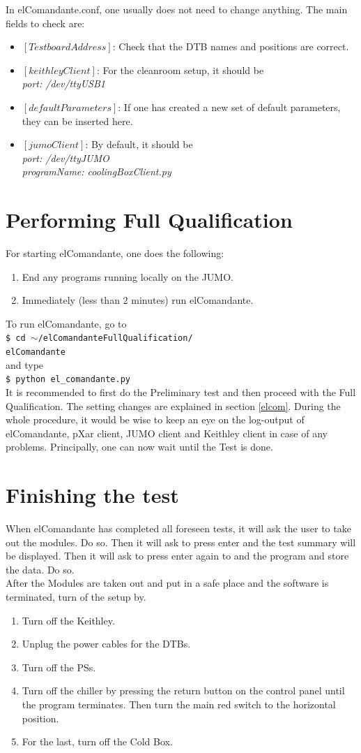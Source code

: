 \documentclass[fleqn,10pt]{SelfArx} %
\newcommand{\shellcmd}[1]{\\\indent\indent\texttt{\footnotesize\$ #1}\\}
\begin{document}
In elComandante.conf, one usually does not need to change anything. The main fields to check are:
\begin{itemize}
\item $[TestboardAddress]$: Check that the DTB names and positions are correct.
\item $[keithleyClient]$: For the cleanroom setup, it should be\\
{\it port: /dev/ttyUSB1}
\item $[defaultParameters]$: If one has created a new set of default parameters, they can be inserted here.
\item $[jumoClient]$: By default, it should be\\
{\it port: /dev/ttyJUMO\\programName: coolingBoxClient.py}
\end{itemize}

\section{Performing Full Qualification}
For starting elComandante, one does the following:
\begin{enumerate}
\item End any programs running locally on the JUMO. 
\item Immediately (less than 2 minutes) run elComandante.
\end{enumerate}
To run elComandante, go to 
\shellcmd{cd $\sim$/elComandanteFullQualification/ \\ elComandante}
and type
\shellcmd{python el\_comandante.py}

It is recommended to first do the Preliminary test and then proceed with the Full Qualification. The setting changes are explained in section \ref{elcom}. During the whole procedure, it would be wise to keep an eye on the log-output of elComandante, pXar client, JUMO client and Keithley client in case of any problems. Principally, one can now wait until the Test is done. 

\section{Finishing the test}
When elComandante has completed all foreseen tests, it will ask the user to take out the modules. Do so. Then it will ask to press enter and the test summary will be displayed. Then it will ask to press enter again to and the program and store the data. Do so. \\
After the Modules are taken out and put in a safe place and the software is terminated, turn of the setup by.
\begin{enumerate}
\item Turn off the Keithley.
\item Unplug the power cables for the DTBs.
\item Turn off the PSs.
\item Turn off the chiller by pressing the return button on the control panel until the program terminates. Then turn the main red switch to the horizontal position.
\item For the last, turn off the Cold Box.
\end{enumerate}
\end{document}

